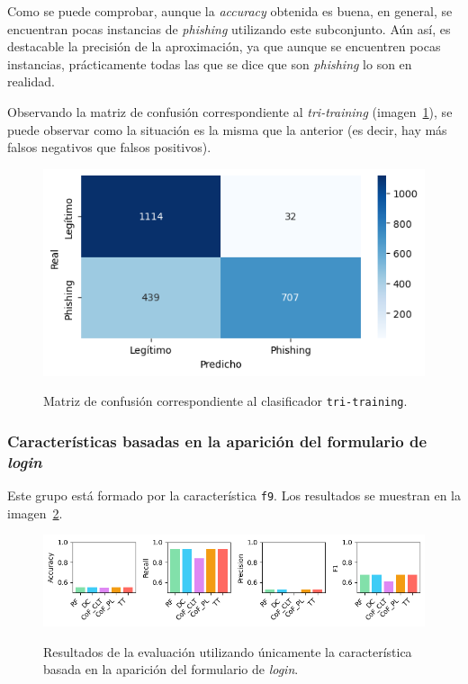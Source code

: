 Como se puede comprobar, aunque la \textit{accuracy} obtenida es buena, en general, se encuentran pocas instancias de \textit{phishing} utilizando este subconjunto. Aún así, es destacable la precisión de la aproximación, ya que aunque se encuentren pocas instancias, prácticamente todas las que se dice que son \textit{phishing} lo son en realidad.

Observando la matriz de confusión correspondiente al \textit{tri-training} (imagen~\ref{gr:ph-f1f8_tt}), se puede observar como la situación es la misma que la anterior (es decir, hay más falsos negativos que falsos positivos).

\begin{figure}[h]
	\caption[\textit{Phishing}: detección (\texttt{f1-f8}, matriz de confusión \texttt{TT})]{Matriz de confusión correspondiente al clasificador \texttt{tri-training}.}
	\centering
	\includegraphics[scale=0.8]{../img/memoria/5_phishing/f1f8_tt}
	\label{gr:ph-f1f8_tt}
\end{figure}

\subsubsection{Características basadas en la aparición del formulario de \textit{login}}
Este grupo está formado por la característica \texttt{f9}. Los resultados se muestran en la imagen~\ref{gr:ph-f9_small}.

\begin{figure}[h]
	\caption[\textit{Phishing}: detección (\texttt{f9})]{Resultados de la evaluación utilizando únicamente la característica basada en la aparición del formulario de \textit{login}.}
	\centering
	\includegraphics[width=\textwidth]{../img/memoria/5_phishing/f9_small}
	\label{gr:ph-f9_small}
\end{figure}


